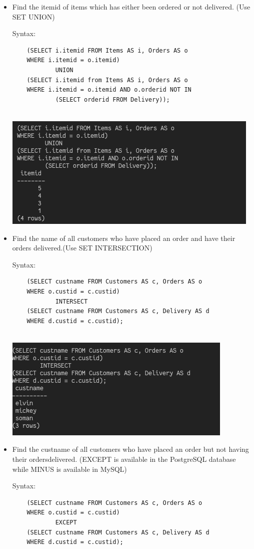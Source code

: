 \documentclass[13pt,oneside]{book}
\begin{document}
\begin{itemize}
	
	\item
	Find the itemid of items which has either been ordered or not delivered. (Use SET
	 UNION)
	 
	Syntax:
	\begin{verbatim}
	(SELECT i.itemid FROM Items AS i, Orders AS o
	WHERE i.itemid = o.itemid)
			UNION
	(SELECT i.itemid from Items AS i, Orders AS o
	WHERE i.itemid = o.itemid AND o.orderid NOT IN
			(SELECT orderid FROM Delivery));
	
	\end{verbatim}
	\includegraphics[]{img/p7/ss7.png}
	
	
	\item
	Find the name of all customers who have placed an order and have their orders
	 delivered.(Use SET INTERSECTION)
	 
	Syntax:
	\begin{verbatim}
	(SELECT custname FROM Customers AS c, Orders AS o
	WHERE o.custid = c.custid)
			INTERSECT
	(SELECT custname FROM Customers AS c, Delivery AS d
	WHERE d.custid = c.custid);
	
	\end{verbatim}
	\includegraphics[]{img/p7/ss8.png}
	
	
	\item
	Find the custname of all customers who have placed an order but not having their
	 ordersdelivered. (EXCEPT is available in the PostgreSQL database while MINUS is
	 available in MySQL)
	 
	Syntax:
	\begin{verbatim}
	(SELECT custname FROM Customers AS c, Orders AS o
	WHERE o.custid = c.custid)
			EXCEPT
	(SELECT custname FROM Customers AS c, Delivery AS d 
	WHERE d.custid = c.custid);
	

\end{verbatim}
\end{itemize}
\end{document}
